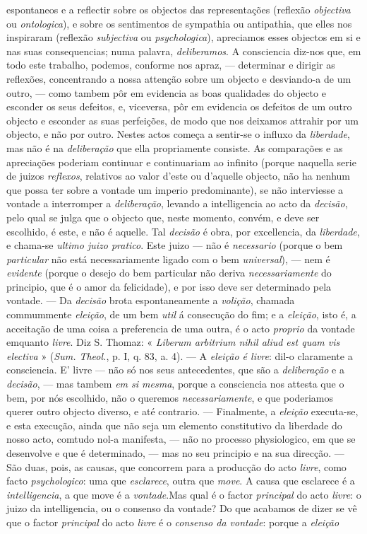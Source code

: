 espontaneos e a reflectir sobre os objectos das representações (reflexão \emph{objectiva} ou \emph{ontologica}), e sobre os sentimentos de sympathia ou antipathia, que elles nos inspiraram (reflexão \emph{subjectiva} ou \emph{psychologica}), apreciamos esses objectos em si e nas suas consequencias; numa palavra, \emph{deliberamos}. A consciencia diz-nos que, em todo este trabalho, podemos, conforme nos apraz, --- determinar e dirigir as reflexões, concentrando a nossa attenção sobre um objecto e desviando-a de um outro, --- como tambem pôr em evidencia as boas qualidades do objecto e esconder os seus defeitos, e, viceversa, pôr em evidencia os defeitos de um outro objecto e esconder as suas perfeições, de modo que nos deixamos attrahir por um objecto, e não por outro. Nestes actos começa a sentir-se o influxo da \emph{liberdade}, mas não é na \emph{deliberação} que ella propriamente consiste. As comparações e as apreciações poderiam continuar e continuariam ao infinito (porque naquella serie de juizos \emph{reflexos}, relativos ao valor d'este ou d'aquelle objecto, não ha nenhum que possa ter sobre a vontade um imperio predominante), se não interviesse a vontade a interromper a \emph{deliberação}, levando a intelligencia ao acto da \emph{decisão}, pelo qual se julga que o objecto que, neste momento, convém, e deve ser escolhido, é este, e não é aquelle. Tal \emph{decisão} é obra, por excellencia, da \emph{liberdade}, e chama-se \emph{ultimo juizo pratico}. Este juizo --- não é \emph{necessario} (porque o bem \emph{particular} não está necessariamente ligado com o bem \emph{universal}), --- nem é \emph{evidente} (porque o desejo do bem particular não deriva \emph{necessariamente} do principio, que é o amor da felicidade), e por isso deve ser determinado pela vontade. --- Da \emph{decisão} brota espontaneamente a \emph{volição}, chamada commummente \emph{eleição}, de um bem \emph{util} á consecução do fim; e a \emph{eleição}, isto é, a acceitação de uma coisa a preferencia de uma outra, é o acto \emph{proprio} da vontade emquanto \emph{livre}. Diz S. Thomaz: « \emph{Liberum arbitrium nihil aliud est quam vis electiva} » (\emph{Sum. Theol.}, p. I, q. 83, a. 4). --- A \emph{eleição é livre}: dil-o claramente a consciencia. E' livre --- não só nos seus antecedentes, que são a \emph{deliberação} e a \emph{decisão}, --- mas tambem \emph{em si mesma}, porque a consciencia nos attesta que o bem, por nós escolhido, não o queremos \emph{necessariamente}, e que poderiamos querer outro objecto diverso, e até contrario. --- Finalmente, a \emph{eleição} executa-se, e esta execução, ainda que não seja um elemento constitutivo da liberdade do nosso acto, comtudo nol-a manifesta, --- não no processo physiologico, em que se desenvolve e que é determinado, --- mas no seu principio e na sua direcção. --- São duas, pois, as causas, que concorrem para a producção do acto \emph{livre}, como facto \emph{psychologico}: uma que \emph{esclarece}, outra que \emph{move}. A causa que esclarece é a \emph{intelligencia}, a que move é a \emph{vontade}.Mas qual é o factor \emph{principal} do acto \emph{livre}: o juizo da intelligencia, ou o consenso da vontade? Do que acabamos de dizer se vê que o factor \emph{principal} do acto \emph{livre} é o \emph{consenso da vontade}: porque a \emph{eleição} 